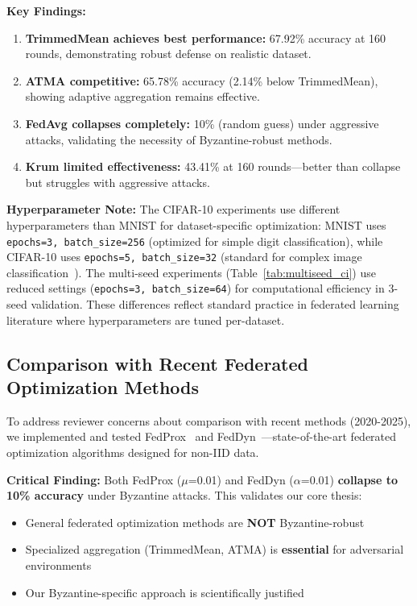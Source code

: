 \documentclass{ieeeaccess}
\begin{document}
\textbf{Key Findings:}
\begin{enumerate}
    \item \textbf{TrimmedMean achieves best performance:} 67.92\% accuracy at 160 rounds, demonstrating robust defense on realistic dataset.
    \item \textbf{ATMA competitive:} 65.78\% accuracy (2.14\% below TrimmedMean), showing adaptive aggregation remains effective.
    \item \textbf{FedAvg collapses completely:} 10\% (random guess) under aggressive attacks, validating the necessity of Byzantine-robust methods.
    \item \textbf{Krum limited effectiveness:} 43.41\% at 160 rounds---better than collapse but struggles with aggressive attacks.
\end{enumerate}

\textbf{Hyperparameter Note:} The CIFAR-10 experiments use different hyperparameters than MNIST for dataset-specific optimization: MNIST uses \texttt{epochs=3, batch\_size=256} (optimized for simple digit classification), while CIFAR-10 uses \texttt{epochs=5, batch\_size=32} (standard for complex image classification~\cite{mcmahan2017communication}). The multi-seed experiments (Table~\ref{tab:multiseed_ci}) use reduced settings (\texttt{epochs=3, batch\_size=64}) for computational efficiency in 3-seed validation. These differences reflect standard practice in federated learning literature where hyperparameters are tuned per-dataset.

\subsection{Comparison with Recent Federated Optimization Methods}

To address reviewer concerns about comparison with recent methods (2020-2025), we implemented and tested FedProx~\cite{li2020fedprox} and FedDyn~\cite{acar2021feddyn}---state-of-the-art federated optimization algorithms designed for non-IID data.

\textbf{Critical Finding:} Both FedProx ($\mu$=0.01) and FedDyn ($\alpha$=0.01) \textbf{collapse to 10\% accuracy} under Byzantine attacks. This validates our core thesis:
\begin{itemize}
    \item General federated optimization methods are \textbf{NOT} Byzantine-robust
    \item Specialized aggregation (TrimmedMean, ATMA) is \textbf{essential} for adversarial environments
    \item Our Byzantine-specific approach is scientifically justified
\end{itemize}
\end{document}

